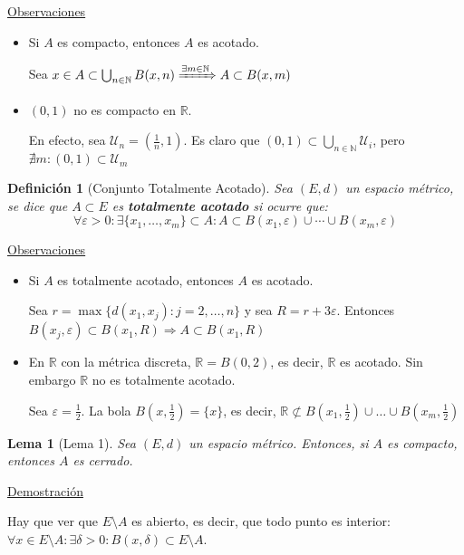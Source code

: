 \documentclass[10pt,a4paper,openright]{book}
\theoremstyle{break}
\newtheorem*{defi}{Definición}
\newtheorem*{lema}{Lema}
\begin{document}
\underline{Observaciones}

\begin{itemize}
\item Si $A$ es compacto, entonces $A$ es acotado.

Sea $x \in A \subset \bigcup_{n \in \mathbb{N}} B(x,n) \xRightarrow{\exists m \in \mathbb{N}} A \subset B(x,m)$

\item $(0,1)$ no es compacto en $\mathbb{R}$.

En efecto, sea $\mathcal{U}_n = (\frac{1}{n}, 1)$. Es claro que $(0,1) \subset \bigcup_{n \in \mathbb{N}} \mathcal{U}_i$, pero $\nexists m : (0,1) \subset \mathcal{U}_m$
\end{itemize}

\newpage

\begin{defi}[Conjunto Totalmente Acotado]
Sea $(E,d)$ un espacio métrico, se dice que $A \subset E$ es \textbf{totalmente acotado} si ocurre que:
$$\forall \varepsilon >0: \exists \{x_1, \ldots, x_m\} \subset A : A \subset B(x_1, \varepsilon) \cup \cdots \cup B(x_m, \varepsilon)$$
\end{defi}

\underline{Observaciones}

\begin{itemize}
\item Si $A$ es totalmente acotado, entonces $A$ es acotado.

Sea $r = \max\{d(x_1, x_j) : j = 2, \ldots, n\}$ y sea $R= r + 3 \varepsilon$. Entonces $B(x_j, \varepsilon) \subset B(x_1, R) \Rightarrow A \subset B(x_1, R)$

\item En $\mathbb{R}$ con la métrica discreta, $\mathbb{R} = B(0,2)$, es decir, $\mathbb{R}$ es acotado. Sin embargo $\mathbb{R}$ no es totalmente acotado.

Sea $\varepsilon = \frac{1}{2}$. La bola $B(x, \frac{1}{2}) = \{x\}$, es decir, $\mathbb{R} \not\subset B(x_1, \frac{1}{2}) \cup \ldots \cup B(x_m, \frac{1}{2})$
\end{itemize}

\begin{lema}[Lema 1]
Sea $(E,d)$ un espacio métrico. Entonces, si $A$ es compacto, entonces $A$ es cerrado.
\end{lema}

\underline{Demostración}

Hay que ver que $E \setminus A$ es abierto, es decir, que todo punto es interior: $\forall x \in E \setminus A: \exists \delta > 0 : B(x, \delta) \subset E \setminus A$.
\end{document}
